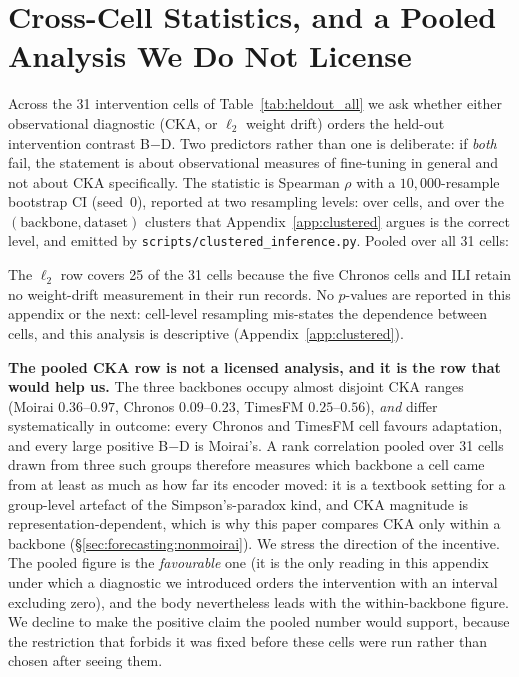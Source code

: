 \section{Cross-Cell Statistics, and a Pooled Analysis We Do Not License}
\label{app:crosscell}

Across the 31 intervention cells of Table~\ref{tab:heldout_all} we ask whether
either observational diagnostic (CKA, or $\ell_2$ weight drift) orders the
held-out intervention contrast B$-$D. Two predictors rather than one is
deliberate: if \emph{both} fail, the statement is about observational measures
of fine-tuning in general and not about CKA specifically. The statistic is
Spearman $\rho$ with a $10{,}000$-resample bootstrap CI (seed~$0$), reported at
two resampling levels: over cells, and over the $(\text{backbone},
\text{dataset})$ clusters that Appendix~\ref{app:clustered} argues is the correct
level, and emitted by \texttt{scripts/clustered\_inference.py}. Pooled over all
31 cells:



\noindent The $\ell_2$ row covers 25 of the 31 cells because the five Chronos
cells and ILI retain no weight-drift measurement in their run records. No
$p$-values are reported in this appendix or the next: cell-level resampling
mis-states the dependence between cells, and this analysis is descriptive
(Appendix~\ref{app:clustered}).

\textbf{The pooled CKA row is not a licensed analysis, and it is the row that
would help us.} The three backbones occupy almost disjoint CKA ranges (Moirai
$0.36$--$0.97$, Chronos $0.09$--$0.23$, TimesFM $0.25$--$0.56$), \emph{and}
differ systematically in outcome: every Chronos and TimesFM cell favours
adaptation, and every large positive B$-$D is Moirai's. A rank
correlation pooled over 31 cells drawn from three such groups therefore
measures which backbone a cell came from at least as much as how far its
encoder moved: it is a textbook setting for a group-level artefact of the
Simpson's-paradox kind, and CKA magnitude is representation-dependent, which is
why this paper compares CKA only within a backbone
(\S\ref{sec:forecasting:nonmoirai}). We stress the direction of the incentive.
The pooled figure is the \emph{favourable} one (it is the only reading in this
appendix under which a diagnostic we introduced orders the intervention with an
interval excluding zero), and the body nevertheless leads with the
within-backbone figure. We decline to make the positive claim the pooled number
would support, because the restriction that forbids it was fixed before these
cells were run rather than chosen after seeing them.

